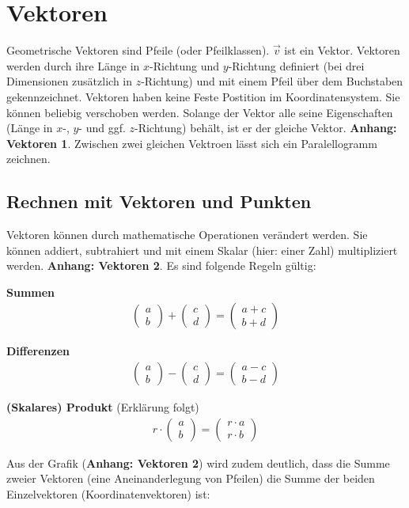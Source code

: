 \documentclass{article}
\newcommand{\m}[1]{\begin{pmatrix}#1\end{pmatrix}}
\begin{document}
    \section{Vektoren}

    Geometrische Vektoren sind Pfeile (oder Pfeilklassen). $\vec{v}$ ist ein Vektor.
    Vektoren werden durch ihre Länge in $x$-Richtung und $y$-Richtung definiert
    (bei drei Dimensionen zusätzlich in $z$-Richtung) und mit einem Pfeil über dem Buchstaben gekennzeichnet.
    Vektoren haben keine Feste Postition im Koordinatensystem. Sie können beliebig verschoben werden.
    Solange der Vektor alle seine Eigenschaften (Länge in $x$-, $y$- und ggf. $z$-Richtung) behält,
    ist er der gleiche Vektor. \textbf{Anhang: Vektoren 1}. Zwischen zwei gleichen Vektroen lässt sich ein
    Paralellogramm zeichnen.
    

    \subsection{Rechnen mit Vektoren und Punkten}
    Vektoren können durch mathematische Operationen verändert werden. 
    Sie können addiert, subtrahiert und mit einem Skalar (hier: einer Zahl) multipliziert werden.
    \textbf{Anhang: Vektoren 2}.
    Es sind folgende Regeln gültig:


    \textbf{Summen}
    \[
        \begin{split}
            \m{a \\ b} + \m{c \\ d} = \m{a+c \\ b+d}
        \end{split}
    \]

    \textbf{Differenzen}
    \[
        \begin{split}
            \m{a \\ b} - \m{c \\ d} = \m{a-c \\ b-d}
        \end{split}
    \]

    \textbf{(Skalares) Produkt} (Erklärung folgt)
    \[
        \begin{split}
            r \cdot \m{a \\ b} = \m{r \cdot a \\ r \cdot b}
        \end{split}
    \]

    Aus der Grafik (\textbf{Anhang: Vektoren 2}) wird zudem deutlich, dass die Summe zweier Vektoren (eine Aneinanderlegung von Pfeilen)
    die Summe der beiden Einzelvektoren (Koordinatenvektoren) ist:
\end{document}
